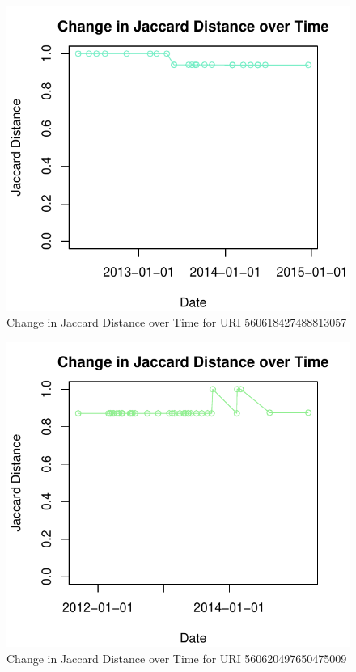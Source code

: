 \documentclass[a4paper,12pt]{article}
\begin{document}
\begin{figure}[H]
    \centering
    \includegraphics{stats/q3/560618427488813057.pdf}
    \caption{Change in Jaccard Distance over Time for URI 560618427488813057}
\end{figure}

\begin{figure}[H]
    \centering
    \includegraphics{stats/q3/560620497650475009.pdf}
    \caption{Change in Jaccard Distance over Time for URI 560620497650475009}
\end{figure}
\end{document}
